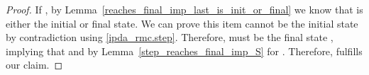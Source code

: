 \begin{isabellebody}
\begin{isamarkuptext}
\begin{lemma}
\begin{proof}
If \isa{{\isasymtau}\ {\isacharequal}{\kern0pt}\ {\isacharbrackleft}{\kern0pt}{\isacharbrackright}{\kern0pt}}, by Lemma~\ref{reaches_final_imp_last_is_init_or_final} we know that 
is either the initial or final state. We can prove this item cannot be the initial state by 
contradiction using \eqref{ipda_rmc.step}. Therefore,  must be the final state 
, implying that  and 
 by Lemma~\ref{step_reaches_final_imp_S} for \isa{{\isasymsigma}\ {\isacharequal}{\kern0pt}\ {\isacharbrackleft}{\kern0pt}{\isacharbrackright}{\kern0pt}}. 
Therefore, \isa{{\isasymrho}} fulfills our claim.


\end{proof}
\end{lemma}
\end{isamarkuptext}
\end{isabellebody}
